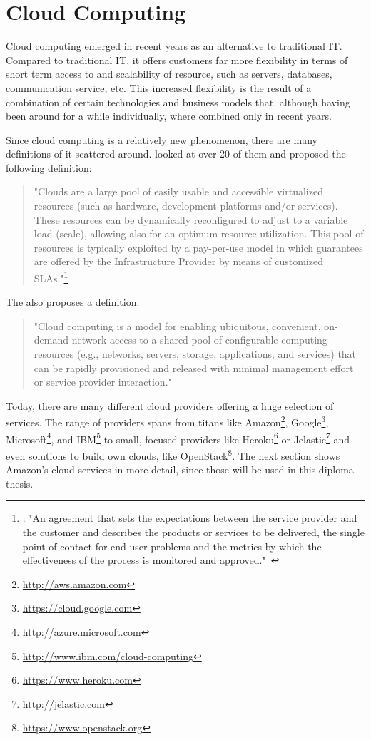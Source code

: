 \section{Cloud Computing}

Cloud computing emerged in recent years as an alternative to traditional IT.
Compared to traditional IT, it offers customers far more flexibility in terms of short term access to and scalability of resource, such as servers, databases, communication service, etc.
This increased flexibility is the result of a combination of certain technologies and business models that, although having been around for a while individually, where combined only in recent years.

Since cloud computing is a relatively new phenomenon, there are many definitions of it scattered around. \citeauthor{cloud:def:towards} looked at over 20 of them and proposed the following definition:

\begin{quote}
	"Clouds are a large pool of easily usable and accessible virtualized resources (such as hardware, development platforms and/or services). These resources can be dynamically reconfigured to adjust to a variable load (scale), allowing also for an optimum resource utilization. This pool of resources is typically exploited by a pay-per-use model in which guarantees are offered by the Infrastructure Provider by means of customized SLAs."\footnote{: "An agreement that sets the expectations between the service provider and the customer and describes the products or services to be delivered, the single point of contact for end-user problems and the metrics by which the effectiveness of the process is monitored and approved."~\autocite{def:sla}}~\autocite{cloud:def:towards}
\end{quote}

The  also proposes a definition:

\begin{quote}
	"Cloud computing is a model for enabling ubiquitous, convenient, on-demand network access to a shared pool of configurable computing resources (e.g., networks, servers, storage, applications, and services) that can be rapidly provisioned and released with minimal management effort or service provider interaction."~\autocite{cloud:def:nist}
\end{quote}

Today, there are many different cloud providers offering a huge selection of services.
The range of providers spans from titans like Amazon\footnote{\url{http://aws.amazon.com}}, Google\footnote{\url{https://cloud.google.com}}, Microsoft\footnote{\url{http://azure.microsoft.com}}, and IBM\footnote{\url{http://www.ibm.com/cloud-computing}} to small, focused providers like Heroku\footnote{\url{https://www.heroku.com}} or Jelastic\footnote{\url{http://jelastic.com}} and even solutions to build own clouds, like OpenStack\footnote{\url{https://www.openstack.org}}.
The next section shows Amazon's cloud services in more detail, since those will be used in this diploma thesis.

